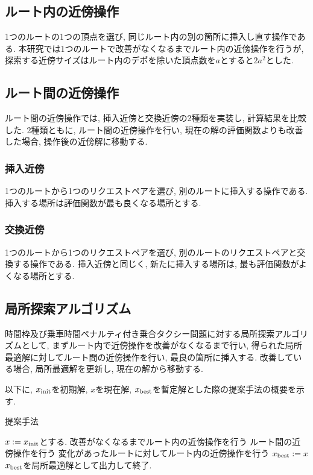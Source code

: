 \subsection{ルート内の近傍操作}
1つのルートの1つの頂点を選び, 同じルート内の別の箇所に挿入し直す操作である. 本研究では1つのルートで改善がなくなるまでルート内の近傍操作を行うが, 探索する近傍サイズはルート内のデポを除いた頂点数を$a$とすると$2a^2$とした.

\subsection{ルート間の近傍操作}
ルート間の近傍操作では, 挿入近傍と交換近傍の2種類を実装し, 計算結果を比較した. 2種類ともに, ルート間の近傍操作を行い, 現在の解の評価関数よりも改善した場合, 操作後の近傍解に移動する.
\subsubsection{挿入近傍}
1つのルートから1つのリクエストペアを選び, 別のルートに挿入する操作である. 挿入する場所は評価関数が最も良くなる場所とする.
\subsubsection{交換近傍}
1つのルートから1つのリクエストペアを選び, 別のルートのリクエストペアと交換する操作である. 挿入近傍と同じく, 新たに挿入する場所は, 最も評価関数がよくなる場所とする.
\subsection{局所探索アルゴリズム}
時間枠及び乗車時間ペナルティ付き乗合タクシー問題に対する局所探索アルゴリズムとして, まずルート内で近傍操作を改善がなくなるまで行い, 得られた局所最適解に対してルート間の近傍操作を行い, 最良の箇所に挿入する. 改善している場合, 局所最適解を更新し, 現在の解から移動する.

以下に, $x_{\rm init}$を初期解, $x$を現在解, $x_{\rm best}$を暫定解とした際の提案手法の概要を示す.
\begin{algorithm}
 \caption{提案手法}
 \label{algo1}
 \begin{algorithmic}[1]%
  \STATE $x := x_{\rm init}$とする.
  \STATE 改善がなくなるまでルート内の近傍操作を行う
  \STATE ルート間の近傍操作を行う
  \STATE 変化があったルートに対してルート内の近傍操作を行う
  \STATE  $x_{\rm best} := x$
  \ENDIF
  \STATE $x_{\rm best}$を局所最適解として出力して終了.
 \end{algorithmic}
\end{algorithm}
